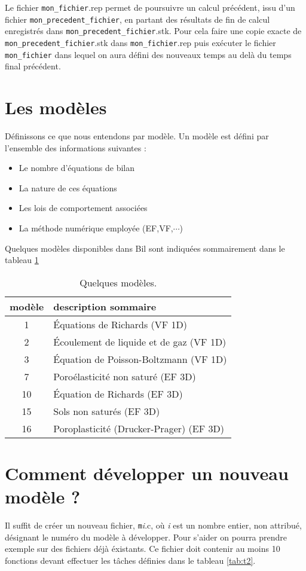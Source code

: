 \documentclass[a4paper,11pt]{article}
\begin{document}
Le fichier {\tt mon\_fichier}.rep permet de poursuivre un calcul pr\'ec\'edent, issu d'un fichier {\tt mon\_precedent\_fichier}, en partant des r\'esultats de fin de calcul enregistr\'es dans {\tt mon\_precedent\_fichier}.stk. Pour cela faire une copie exacte de {\tt mon\_precedent\_fichier}.stk dans {\tt mon\_fichier}.rep puis ex\'ecuter le fichier {\tt mon\_fichier} dans lequel on aura d\'efini des nouveaux temps au del\`a du temps final pr\'ec\'edent.

\section{Les mod\`eles}
D\'efinissons ce que nous entendons par mod\`ele. Un mod\`ele est d\'efini par l'ensemble des informations suivantes :
\begin{itemize}
\item Le nombre d'\'equations de bilan
\item La nature de ces \'equations
\item Les lois de comportement associ\'ees
\item La m\'ethode num\'erique employ\'ee (EF,VF,$\cdots$)
\end{itemize}

Quelques mod\`eles disponibles dans Bil sont indiqu\'ees sommairement dans le tableau \ref{tab:t5}


\begin{table}[ht]
\begin{center}
\begin{tabular}{|c|l|}
\hline
mod\`ele & description sommaire\\ \hline\hline
1 & \'Equations de Richards (VF 1D)\\ \hline
2 & \'Ecoulement de liquide et de gaz (VF 1D)\\ \hline
3 & \'Equation de Poisson-Boltzmann (VF 1D)\\ \hline
7 & Poro\'elasticit\'e non satur\'e (EF 3D)\\ \hline
10 & \'Equation de Richards (EF 3D)\\ \hline
15 & Sols non satur\'es (EF 3D)\\ \hline
16 & Poroplasticit\'e (Drucker-Prager) (EF 3D)\\ \hline
\end{tabular}
\end{center}
\caption{Quelques mod\`eles.}
\label{tab:t5}
\end{table}

\section{Comment d\'evelopper un nouveau mod\`ele ?}
Il suffit de cr\'eer un nouveau fichier, {\tt m}\textit{i}.c, o\`u \textit{i} est un nombre entier, non attribu\'e, d\'esignant le num\'ero du mod\`ele \`a d\'evelopper. Pour s'aider on pourra prendre exemple sur des fichiers d\'ej\`a \'existants. Ce fichier doit contenir au moins 10 fonctions devant effectuer les t\^aches d\'efinies dans le tableau \ref{tab:t2}.
\end{document}
